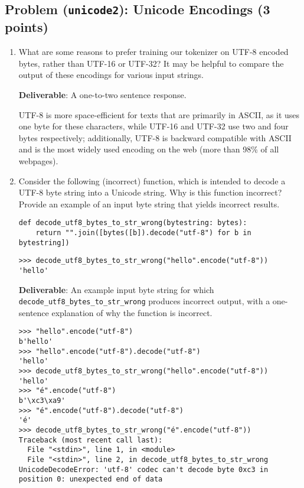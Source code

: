 \documentclass{article}
\newcounter{problem}
\newcommand{\problem}[2]{
    \stepcounter{problem}
    \subsection{Problem (\texttt{#1}): #2}
    \vspace{-1.5em} %
    \noindent
}
\begin{document}
\problem{unicode2}{Unicode Encodings (3 points)}

\begin{enumerate}[label=(\alph*)]
    \item {What are some reasons to prefer training our tokenizer on UTF-8 encoded bytes, rather than UTF-16 or UTF-32? It may be helpful to compare the output of these encodings for various input strings.}
    
    {\textbf{Deliverable}: A one-to-two sentence response.}
    
    \begin{answer}
    UTF-8 is more space-efficient for texts that are primarily in ASCII, as it uses one byte for these characters, while UTF-16 and UTF-32 use two and four bytes respectively; additionally, UTF-8 is backward compatible with ASCII and is the most widely used encoding on the web (more than 98\% of all webpages).
    \end{answer}
    
    \item {Consider the following (incorrect) function, which is intended to decode a UTF-8 byte string into a Unicode string. Why is this function incorrect? Provide an example of an input byte string that yields incorrect results.}
    
    \begin{lstlisting}
def decode_utf8_bytes_to_str_wrong(bytestring: bytes):
    return "".join([bytes([b]).decode("utf-8") for b in bytestring])
    \end{lstlisting}
    
    \begin{lstlisting}
>>> decode_utf8_bytes_to_str_wrong("hello".encode("utf-8"))
'hello'
    \end{lstlisting}
    
    {\textbf{Deliverable}: An example input byte string for which \texttt{decode\_utf8\_bytes\_to\_str\_wrong} produces incorrect output, with a one-sentence explanation of why the function is incorrect.}
    
    \begin{lstlisting}
>>> "hello".encode("utf-8")
b'hello'
>>> "hello".encode("utf-8").decode("utf-8")
'hello'
>>> decode_utf8_bytes_to_str_wrong("hello".encode("utf-8"))
'hello'
>>> "é".encode("utf-8")
b'\xc3\xa9'
>>> "é".encode("utf-8").decode("utf-8")
'é' 
>>> decode_utf8_bytes_to_str_wrong("é".encode("utf-8"))
Traceback (most recent call last):
  File "<stdin>", line 1, in <module>
  File "<stdin>", line 2, in decode_utf8_bytes_to_str_wrong
UnicodeDecodeError: 'utf-8' codec can't decode byte 0xc3 in position 0: unexpected end of data
    \end{lstlisting}


\end{enumerate}
\end{document}
